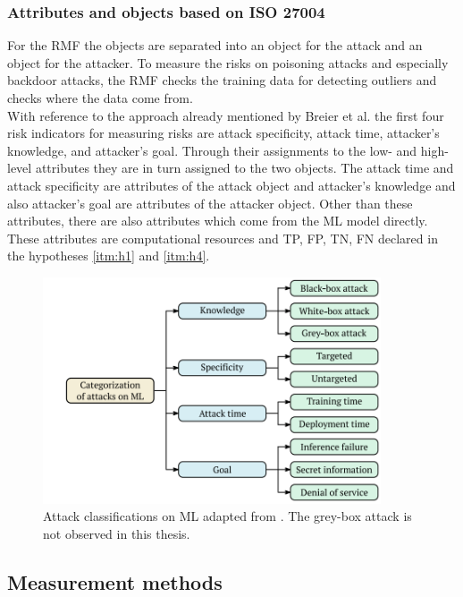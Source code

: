 \subsubsection*{Attributes and objects based on ISO 27004}

For the RMF the objects are separated into an object for the attack and an object for the attacker. To measure the risks on poisoning attacks and especially backdoor attacks, the RMF checks the training data for detecting outliers and checks where the data come from. \\ With reference to the approach already mentioned by Breier et al. \cite{DBLP:journals/corr/abs-2012-04884} the first four risk indicators for measuring risks are attack specificity, attack time, attacker's knowledge, and attacker's goal. Through their assignments to the low- and high-level attributes they are in turn assigned to the two objects. The attack time and attack specificity are attributes of the attack object and attacker's knowledge and also attacker's goal are attributes of the attacker object. Other than these attributes, there are also attributes which come from the ML model directly. These attributes are computational resources and TP, FP, TN, FN declared in the hypotheses \ref{itm:h1} and \ref{itm:h4}.

\begin{figure}[ht!]
  \centering
  \includegraphics[width=10cm]{pictures/classifi_attacks_ml.png}
  \caption{Attack classifications on ML adapted from \cite{DBLP:journals/corr/abs-2012-04884}. The grey-box attack is not observed in this thesis.}
  \label{fig:classifi_attacks_ml}
\end{figure}

\subsection{Measurement methods}

